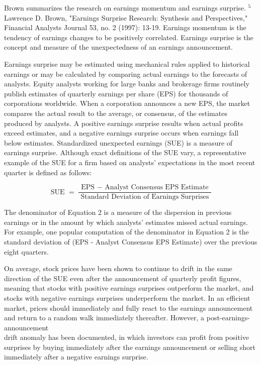 \documentclass[11pt]{article}
\begin{document}
Brown summarizes the research on earnings momentum and earnings surprise. ${ }^{5}$ Lawrence D. Brown, "Earnings Surprise Research: Synthesis and Perspectives," Financial Analysts Journal 53, no. 2 (1997): 13-19. Earnings momentum is the tendency of earnings changes to be positively correlated. Earnings surprise is the concept and measure of the unexpectedness of an earnings announcement.

Earnings surprise may be estimated using mechanical rules applied to historical earnings or may be calculated by comparing actual earnings to the forecasts of analysts. Equity analysts working for large banks and brokerage firms routinely publish estimates of quarterly earnings per share (EPS) for thousands of corporations worldwide. When a corporation announces a new EPS, the market compares the actual result to the average, or consensus, of the estimates produced by analysts. A positive earnings surprise results when actual profits exceed estimates, and a negative earnings surprise occurs when earnings fall below estimates. Standardized unexpected earnings (SUE) is a measure of earnings surprise. Although exact definitions of the SUE vary, a representative example of the SUE for a firm based on analysts' expectations in the most recent quarter is defined as follows:


\begin{equation*}
\text { SUE }=\frac{\text { EPS }- \text { Analyst Consensus EPS Estimate }}{\text { Standard Deviation of Earnings Surprises }} \tag{2}
\end{equation*}


The denominator of Equation 2 is a measure of the dispersion in previous earnings or in the amount by which analysts' estimates missed actual earnings. For example, one popular computation of the denominator in Equation 2 is the standard deviation of (EPS - Analyst Consensus EPS Estimate) over the previous eight quarters.

On average, stock prices have been shown to continue to drift in the same direction of the SUE even after the announcement of quarterly profit figures, meaning that stocks with positive earnings surprises outperform the market, and stocks with negative earnings surprises underperform the market. In an efficient market, prices should immediately and fully react to the earnings announcement and return to a random walk immediately thereafter. However, a post-earnings-announcement\\
drift anomaly has been documented, in which investors can profit from positive surprises by buying immediately after the earnings announcement or selling short immediately after a negative earnings surprise.
\end{document}
